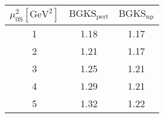 \begin{tabular}{|c|c|c|}
\hline
	$\mu_{0\mathrm{S}}^2[\mathrm{GeV^2}]$ & $\mathrm{BGKS_{pert}}$ &  $ \mathrm{BGKS_{np}}$\\\hline
 1 & 1.18 & 1.17 \\\hline
 2 & 1.21 & 1.17 \\\hline
 3 & 1.25 & 1.21 \\\hline
 4 & 1.29 & 1.21 \\\hline
 5 & 1.32 & 1.22 \\\hline
 \end{tabular} 
